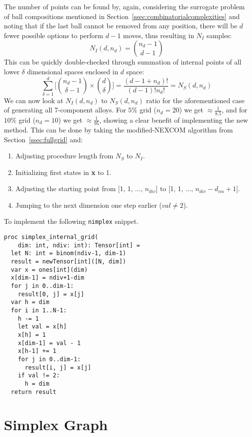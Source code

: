 The number of points can be found by, again, considering the surrogate problem of ball compositions mentioned in Section~\ref{ssec:combinatorialcomplexities} and noting that if the last ball cannot be removed from any position, there will be $d$ fewer possible options to perform $d-1$ moves, thus resulting in $N_I$ samples:
\begin{equation}
    N_I(d, n_d) = \binom{n_d-1}{d-1}
\end{equation}
This can be quickly double-checked through summation of internal points of all lower $\delta$ dimensional spaces enclosed in $d$ space:
\[\sum_{\delta=1}^d \Biggl[ \binom{n_d-1}{\delta-1} \times \binom{d}{\delta} \Biggr] =  \frac{(d - 1 + n_d)!}{(d-1)!n_d!} = N_S(d, n_d)\]
We can now look at $N_I(d, n_d)$ to $N_S(d, n_d)$ ratio for the aforementioned case of generating all 7-component alloys. For $5\%$ grid ($n_d=20$) we get $\approx \frac{1}{8.5}$, and for $10\%$ grid ($n_d=10$) we get $\approx \frac{1}{95}$, showing a clear benefit of implementing the new method. This can be done by taking the modified-NEXCOM algorithm \cite{Chasalow1995AlgorithmPoints} from Section~\ref{ssec:fullgrid} and:
\begin{enumerate}
    \item Adjusting procedure length from $N_S$ to $N_I$.
    \item Initializing first states in \textbf{x} to 1.
    \item Adjusting the starting point from [1, 1, ..., $n_{div}$] to [1, 1, ..., $n_{div}-d_{im}+1$].
    \item Jumping to the next dimension one step earlier ($val \neq 2$).
\end{enumerate}

To implement the following \texttt{nimplex} snippet.

\begin{verbatim}
proc simplex_internal_grid(
    dim: int, ndiv: int): Tensor[int] =
  let N: int = binom(ndiv-1, dim-1)
  result = newTensor[int]([N, dim])
  var x = ones[int](dim)
  x[dim-1] = ndiv+1-dim
  for j in 0..dim-1:
    result[0, j] = x[j]
  var h = dim
  for i in 1..N-1:
    h -= 1
    let val = x[h]
    x[h] = 1
    x[dim-1] = val - 1
    x[h-1] += 1
    for j in 0..dim-1:
      result[i, j] = x[j]
    if val != 2:
      h = dim
  return result
\end{verbatim}


\section{Simplex Graph} \label{sec:simplexgraph}


